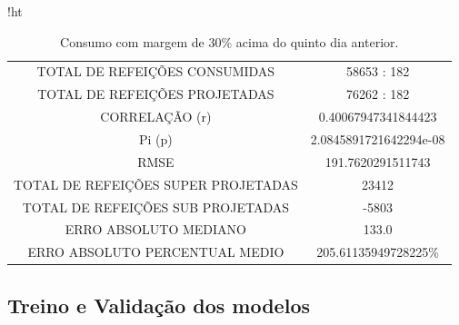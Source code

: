 \documentclass[	12pt, Times, openright, twoside, a4paper, english, brazil]{abntex2}
\begin{document}
                 \begin{table}{!ht}
                \centering
                \caption{Consumo com margem de 30\% acima do quinto dia anterior.}
                    \begin{tabular}{|c|c|}
                    \rowcolor{gray!50}
                    \hline
                    \multicolumn{2}{c}{Consumo com margem 30\% acima do 5o dia anterior}\\ \hline     
                    TOTAL DE REFEIÇÕES CONSUMIDAS & 58653 : 182  \\
                TOTAL DE REFEIÇÕES PROJETADAS & 76262 : 182 \\ 
                CORRELAÇÃO (r)&  0.40067947341844423 \\
                Pi (p) & 2.0845891721642294e-08\\
                RMSE & 191.7620291511743 \\
                TOTAL DE REFEIÇÕES SUPER PROJETADAS & 23412 \\
                TOTAL DE REFEIÇÕES SUB PROJETADAS & -5803 \\
                ERRO ABSOLUTO MEDIANO & 133.0 \\
                ERRO ABSOLUTO PERCENTUAL MEDIO & 205.61135949728225\% \\  \hline \end{tabular}\end{table}
                
                
    	\subsection{Treino e Validação dos modelos}
    	    \begin{figure}[H]
            \end{figure}
            \begin{figure}[H]
            \end{figure}
            
\end{document}

